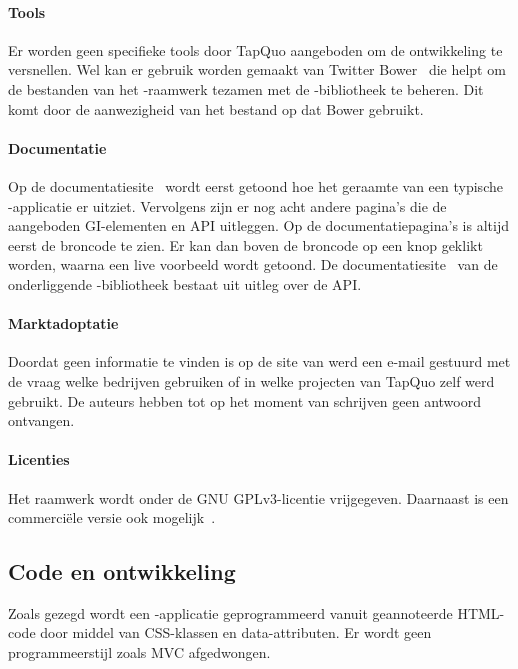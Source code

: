 \paragraph{Tools}
Er worden geen specifieke tools door TapQuo aangeboden om de ontwikkeling te versnellen.
Wel kan er gebruik worden gemaakt van Twitter Bower~\cite{Twitter2013} die helpt om de bestanden van het \lungo{}-raamwerk tezamen met de \quo{}-bibliotheek te beheren.
Dit komt door de aanwezigheid van het bestand  op \gh{} dat Bower gebruikt.

\paragraph{Documentatie}
Op de documentatiesite~\cite{Lungo2013} wordt eerst getoond hoe het geraamte van een typische \lungo{}-applicatie er uitziet.
Vervolgens zijn er nog acht andere pagina's die de aangeboden GI-elementen en API uitleggen.
Op de documentatiepagina's is altijd eerst de broncode te zien.
Er kan dan boven de broncode op een knop geklikt worden, waarna een live voorbeeld wordt getoond.
De documentatiesite~\cite{TapQuo2013c} van de onderliggende \js{}-bibliotheek bestaat uit uitleg over de API.

\paragraph{Marktadoptatie}
Doordat geen informatie te vinden is op de site van \lungo{} werd een e-mail gestuurd met de vraag welke bedrijven \lungo{} gebruiken of in welke projecten van TapQuo zelf \lungo{} werd gebruikt.
De auteurs hebben tot op het moment van schrijven geen antwoord ontvangen.

\paragraph{Licenties}
Het raamwerk wordt onder de GNU GPLv3-licentie vrijgegeven.
Daarnaast is een commerciële versie ook mogelijk~\cite{TapQuo2013d}.

\subsection{Code en ontwikkeling}
Zoals gezegd wordt een \lungo{}-applicatie geprogrammeerd vanuit geannoteerde HTML-code door middel van CSS-klassen en data-attributen.
Er wordt geen programmeerstijl zoals MVC afgedwongen.

